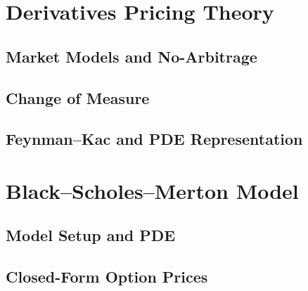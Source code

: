 \section{Derivatives Pricing Theory}

\subsection{Market Models and No-Arbitrage}




\subsection{Change of Measure}



\subsection{Feynman--Kac and PDE Representation}




\section{Black--Scholes--Merton Model}

\subsection{Model Setup and PDE}




\subsection{Closed-Form Option Prices}

